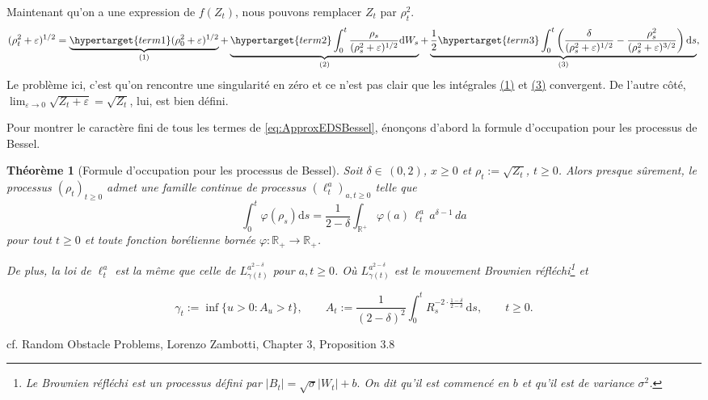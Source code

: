 \documentclass[openany]{book}
\makeatletter
\newcommand{\1}{\mathbbm{1}}
\renewcommand{\d}{\mathrm{d}}
\renewenvironment{proof}[1][\textbf{\textit{Démonstration}}]{%
  \par\pushQED{\qed}%
  \normalfont\topsep6\p@\@plus6\p@\relax
  \trivlist\item[\hskip\labelsep
    #1\@addpunct{.}]\ignorespaces
}{%
  \popQED\endtrivlist\@endpefalse
}
\theoremstyle{thmfont}
\newtheorem{theorem}{Théorème}[chapter]
\theoremstyle{deffont}
\theoremstyle{thmfont}
\theoremstyle{deffont}
\makeatother
\begin{document}
Maintenant qu'on a une expression de $f(Z_t)$, nous pouvons remplacer $Z_t$ par $\rho_t^2$.
\begin{equation}
  (\rho_t^2 + \varepsilon)^{1/2} = \underbrace{\hypertarget{term1}(\rho_0^2 + \varepsilon)^{1/2}}_{(1)}
  + \underbrace{\hypertarget{term2}\int_0^t  \dfrac{\rho_s}{(\rho_s^2 + \varepsilon)^{1/2}}\d W_s}_{(2)}
  +  \underbrace{ \dfrac{1}{2} \hypertarget{term3} \int_0^t \left(\dfrac{\delta}{(\rho_s^2 + \varepsilon)^{1/2}} - \dfrac{\rho_s^2}{(\rho_s^2 + \varepsilon)^{3/2}}\right)\d s}_{(3)},
  \label{eq:ApproxEDSBessel}
\end{equation}
Le problème ici, c'est qu'on rencontre une singularité en zéro et ce n'est pas clair que les intégrales \hyperlink{term1}{(1)} et \hyperlink{term3}{(3)} convergent. De l'autre côté, $\lim_{\varepsilon \to 0} \sqrt{Z_t + \varepsilon} = \sqrt{Z_t}$, lui, est bien défini.

Pour montrer le caractère fini de tous les termes de \eqref{eq:ApproxEDSBessel}, énonçons d'abord la formule d'occupation pour les processus de Bessel.

\begin{theorem}[Formule d'occupation pour les processus de Bessel]
  \label{thm:occupationBessel}
  Soit $\delta \in \, (0,2)$, $x \geq 0$ et $\rho_t := \sqrt{Z_t}$, $t \geq 0$. Alors presque sûrement, le processus $(\rho_t)_{t \geq 0}$ admet une famille continue de processus $(\ell_t^a)_{a, t \geq 0}$ telle que
\begin{equation}
  \int_0^t \varphi(\rho_s)\d s = \frac{1}{2 - \delta} \int_{\mathbb{R}^+} \varphi(a)\, \ell_t^a\, a^{\delta - 1}\, da
  \end{equation}
pour tout $t \geq 0$ et toute fonction borélienne bornée $\varphi : \mathbb{R}_+ \rightarrow \mathbb{R}_+$.

De plus, la loi de $\ell_t^a$ est la même que celle de $L_{\gamma(t)}^{a^{2-\delta}}$ pour $a, t \geq 0$. Où $L_{\gamma(t)}^{a^{2-\delta}}$ est le mouvement Brownien réfléchi\footnote{Le Brownien réfléchi est un processus défini par $|B_t| = \sqrt{\sigma}|W_t| + b.$ On dit qu'il est commencé en $b$ et qu'il est de variance $\sigma^2$.} et

  $$\gamma_t := \inf\{ u > 0 : A_u > t \}, \qquad
A_t := \frac{1}{(2 - \delta)^2} \int_0^t R_s^{-2 \cdot \frac{1 - \delta}{2 - \delta}} \, \mathrm{d}s, \qquad t \geq 0.
$$
\end{theorem}
\begin{proof}cf. Random Obstacle Problems, Lorenzo Zambotti, Chapter 3, Proposition 3.8
\end{proof}
\end{document}
